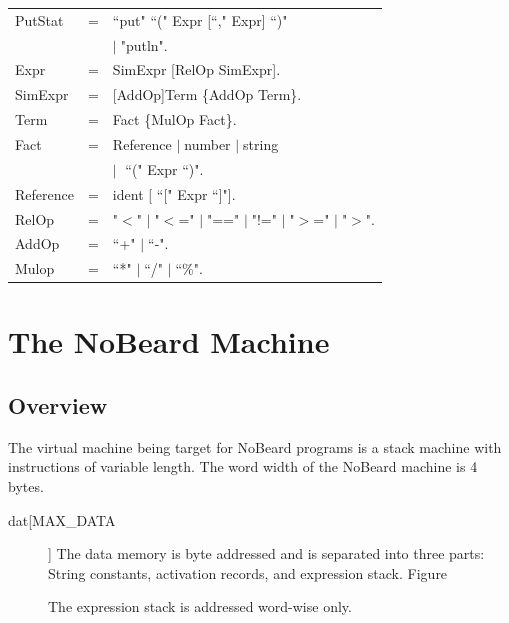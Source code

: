 \documentclass[11pt]{report}
\newcommand{\leongage}{NoBeard}
\newenvironment{grammar}
	{\begin{tabular}[b]{lcl}}
	{\end{tabular}}
\newcommand{\alternative}{$\mid \;$}
\begin{document}
\begin{grammar}
	
	PutStat & = & ``put" ``(" Expr [``," Expr] ``)" \\
	&& \alternative "putln". \\
	
	Expr & = & SimExpr [RelOp SimExpr]. \\
	
	SimExpr & = & [AddOp]Term \{AddOp Term\}. \\
	
	Term & = & Fact \{MulOp Fact\}. \\
	
	Fact & = & Reference \alternative number \alternative string \\
	&& \alternative %
	``(" Expr ``)". \\
	
	Reference & = & ident [ ``[" Expr ``]"]. \\
	
	RelOp & = & "$<$" \alternative "$<$=" \alternative "==" \alternative "!=" \alternative "$>$=" \alternative "$>$". \\
	
	AddOp & = & ``+" \alternative ``-". \\
	
	Mulop & = & ``*" \alternative ``/" \alternative ``\%".
	
	\end{grammar}

\chapter{The \leongage{} Machine}
\section{Overview}
The virtual machine being target for \leongage{} programs is a stack machine with instructions of variable length. The word
width of the \leongage{} machine is 4 bytes.

\begin{description}
	\item[dat[MAX\_DATA]] The data memory is byte addressed and is separated into three parts: String constants,
	activation records, and expression stack. Figure
	
	The expression stack is addressed word-wise only.
\end{description}
\end{document}
